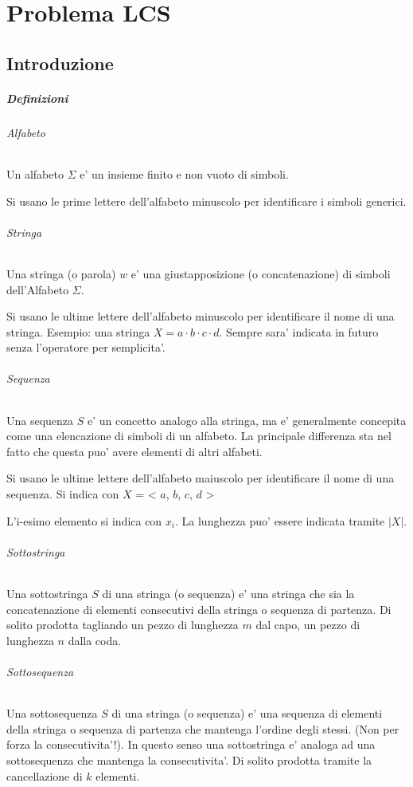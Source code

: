 \chapter{Problema LCS}

\section{Introduzione}

\paragraph{Definizioni}

\subparagraph{Alfabeto}

Un alfabeto $\Sigma$ e' un insieme finito e non vuoto di simboli.

Si usano le prime lettere dell'alfabeto minuscolo per identificare i simboli generici.

\subparagraph{Stringa}

Una stringa (o parola) $w$ e' una giustapposizione (o concatenazione) di simboli dell'Alfabeto $\Sigma$.

Si usano le ultime lettere dell'alfabeto minuscolo per identificare il nome di una stringa.
Esempio: una stringa $X = a \cdot b \cdot c \cdot d$.
Sempre sara' indicata in futuro senza l'operatore per semplicita'.

\subparagraph{Sequenza}

Una sequenza $S$ e' un concetto analogo alla stringa, ma e' generalmente concepita come una elencazione di simboli di un alfabeto.
La principale differenza sta nel fatto che questa puo' avere elementi di altri alfabeti.

Si usano le ultime lettere dell'alfabeto maiuscolo per identificare il nome di una sequenza.
Si indica con $X$ = < $a$, $b$, $c$, $d$ >

L'i-esimo elemento si indica con $x_{i}$.
La lunghezza puo' essere indicata tramite $|X|$.

\subparagraph{Sottostringa}

Una sottostringa $S$ di una stringa (o sequenza) e' una stringa che sia la concatenazione di elementi consecutivi della stringa o sequenza di partenza.
Di solito prodotta tagliando un pezzo di lunghezza $m$ dal capo, un pezzo di lunghezza $n$ dalla coda.

\subparagraph{Sottosequenza}

Una sottosequenza $S$ di una stringa (o sequenza) e' una sequenza di elementi della stringa o sequenza di partenza che mantenga l'ordine degli stessi. (Non per forza la consecutivita'!).
In questo senso una sottostringa e' analoga ad una sottosequenza che mantenga la consecutivita'.
Di solito prodotta tramite la cancellazione di $k$ elementi.

